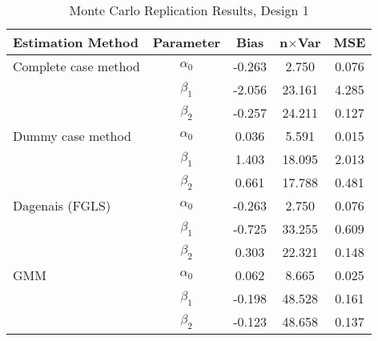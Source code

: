 \begin{table}
\centering
\caption{Monte Carlo Replication Results, Design 1}
\label{table:MCReplicationResultsDesign1}
\begin{tabular}{lcccc}
\toprule
Estimation Method & Parameter & Bias & n$\times$Var & MSE \\
\midrule
Complete case method & $\alpha_0$ & -0.263 & 2.750 & 0.076 \\
 & $\beta_1$ & -2.056 & 23.161 & 4.285 \\
 & $\beta_2$ & -0.257 & 24.211 & 0.127 \\
Dummy case method & $\alpha_0$ & 0.036 & 5.591 & 0.015 \\
 & $\beta_1$ & 1.403 & 18.095 & 2.013 \\
 & $\beta_2$ & 0.661 & 17.788 & 0.481 \\
Dagenais (FGLS) & $\alpha_0$ & -0.263 & 2.750 & 0.076 \\
 & $\beta_1$ & -0.725 & 33.255 & 0.609 \\
 & $\beta_2$ & 0.303 & 22.321 & 0.148 \\
GMM & $\alpha_0$ & 0.062 & 8.665 & 0.025 \\
 & $\beta_1$ & -0.198 & 48.528 & 0.161 \\
 & $\beta_2$ & -0.123 & 48.658 & 0.137 \\
\bottomrule
\end{tabular}
\end{table}
